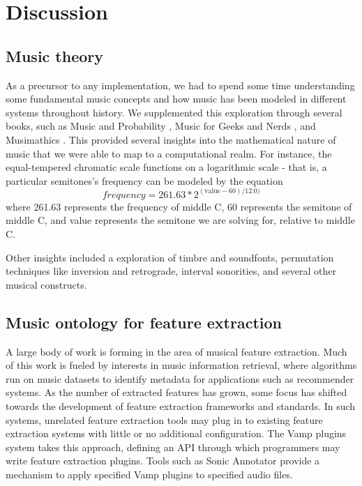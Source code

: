 \documentclass[11pt,conference,letterpaper]{IEEEtran}
\begin{document}
\section{Discussion}

\subsection {Music theory}
As a precursor to any implementation, we had to spend some time understanding some fundamental music concepts and how music has been modeled in different systems throughout history. We supplemented this exploration through several books, such as Music and Probability \cite{temperly2007mprob}, Music for Geeks and Nerds \cite{krogerGeeksNerds}, and Musimathics \cite{loy2006musimathics}.  This provided several insights into the mathematical nature of music that we were able to map to a computational realm. For instance, the equal-tempered chromatic scale functions on a logarithmic scale - that is, a particular semitones's frequency can be modeled by the equation
{\small
	\[frequency = 261.63 * 2^{(\text{value} - 60) / 12.0)}\]
}
where 261.63 represents the frequency of middle C, 60 represents the semitone of middle C, and value represents the semitone we are solving for, relative to middle C.

Other insights included a exploration of timbre and soundfonts, permutation techniques like inversion and retrograde, interval sonorities, and several other musical constructs.

\subsection{Music ontology for feature extraction}

A large body of work is forming in the area of musical feature extraction. Much of this work is fueled by interests in music information retrieval, where algorithms run on music datasets to identify metadata for applications such as recommender systems. As the number of extracted features has grown, some focus has shifted towards the development of feature extraction frameworks and standards. In such systems, unrelated feature extraction tools may plug in to existing feature extraction systems with little or no additional configuration. The Vamp plugins system takes this approach, defining an API through which programmers may write feature extraction plugins. Tools such as Sonic Annotator provide a mechanism to apply specified Vamp plugins to specified audio files.
\end{document}
